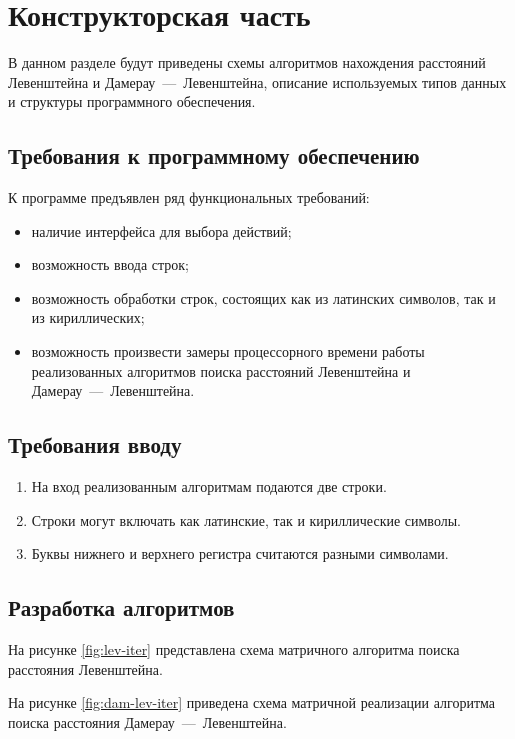 \chapter{Конструкторская часть}

В данном разделе будут приведены схемы алгоритмов нахождения расстояний Левенштейна и Дамерау~---~Левенштейна, описание используемых типов данных и структуры программного обеспечения.

\section{Требования к программному обеспечению}

К программе предъявлен ряд функциональных требований:

\begin{itemize}
    \item наличие интерфейса для выбора действий;
    \item возможность ввода строк;
    \item возможность обработки строк, состоящих как из латинских символов, так и из кириллических;
    \item возможность произвести замеры процессорного времени работы реализованных алгоритмов поиска расстояний Левенштейна и Дамерау~---~Левенштейна.
\end{itemize}

\section{Требования вводу}

\begin{enumerate}
    \item На вход реализованным алгоритмам подаются две строки.
    \item Строки могут включать как латинские, так и кириллические символы.
    \item Буквы нижнего и верхнего регистра считаются разными символами.
\end{enumerate}

\section{Разработка алгоритмов}

На рисунке \ref{fig:lev-iter} представлена схема матричного алгоритма поиска расстояния Левенштейна.

На рисунке \ref{fig:dam-lev-iter} приведена схема матричной реализации алгоритма поиска расстояния Дамерау~---~Левенштейна.

